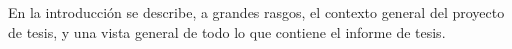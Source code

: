 En la introducción se describe, a grandes rasgos, el contexto general del proyecto de tesis, y una vista general de todo lo que contiene el informe de tesis.
